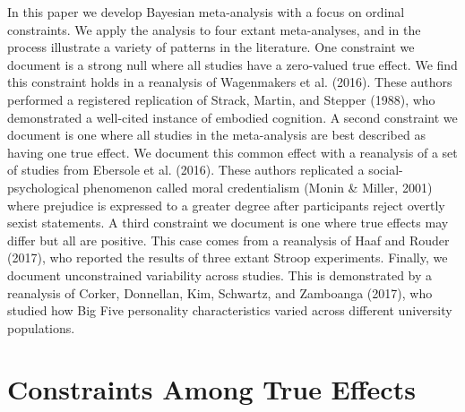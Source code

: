 \documentclass[english,man]{apa6}
\theoremstyle{definition}
\theoremstyle{definition}
\theoremstyle{definition}
\theoremstyle{remark}
\begin{document}
In this paper we develop Bayesian meta-analysis with a focus on ordinal
constraints. We apply the analysis to four extant meta-analyses, and in
the process illustrate a variety of patterns in the literature. One
constraint we document is a strong null where all studies have a
zero-valued true effect. We find this constraint holds in a reanalysis
of Wagenmakers et al. (2016). These authors performed a registered
replication of Strack, Martin, and Stepper (1988), who demonstrated a
well-cited instance of embodied cognition. A second constraint we
document is one where all studies in the meta-analysis are best
described as having one true effect. We document this common effect with
a reanalysis of a set of studies from Ebersole et al. (2016). These
authors replicated a social-psychological phenomenon called moral
credentialism (Monin \& Miller, 2001) where prejudice is expressed to a
greater degree after participants reject overtly sexist statements. A
third constraint we document is one where true effects may differ but
all are positive. This case comes from a reanalysis of Haaf and Rouder
(2017), who reported the results of three extant Stroop experiments.
Finally, we document unconstrained variability across studies. This is
demonstrated by a reanalysis of Corker, Donnellan, Kim, Schwartz, and
Zamboanga (2017), who studied how Big Five personality characteristics
varied across different university populations.

\section{Constraints Among True
Effects}\label{constraints-among-true-effects}
\end{document}
